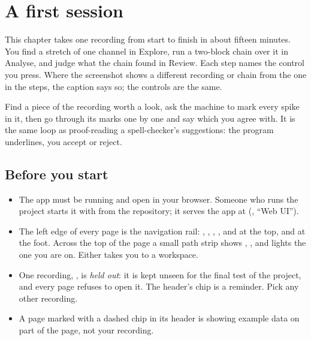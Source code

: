 \chapter{A first session}\label{ch:first-session}
This chapter takes one recording from start to finish in about fifteen minutes. You find a
stretch of one channel in Explore, run a two-block chain over it in Analyse, and judge what
the chain found in Review. Each step names the control you press. Where the screenshot shows
a different recording or chain from the one in the steps, the caption says so; the controls
are the same.

\begin{plainterms}
Find a piece of the recording worth a look, ask the machine to mark every spike in it, then
go through its marks one by one and say which you agree with. It is the same loop as
proof-reading a spell-checker's suggestions: the program underlines, you accept or reject.
\end{plainterms}

\section{Before you start}\label{sec:first-session-before}
\begin{itemize}
  \item The app must be running and open in your browser. Someone who runs the project
    starts it with  from the repository; it serves the
    app at  (, ``Web UI'').
  \item The left edge of every page is the navigation rail: , ,
    , ,  and  at the top,  and
     at the foot. Across the top of the page a small path strip shows
    , ,  and lights the one you are on. Either takes you
    to a workspace.
  \item One recording, , is \emph{held out}: it is kept unseen
    for the final test of the project, and every page refuses to open it. The header's
     chip is a reminder. Pick any other recording.
  \item A page marked with a dashed  chip in its header is showing example
    data on part of the page, not your recording.
\end{itemize}

